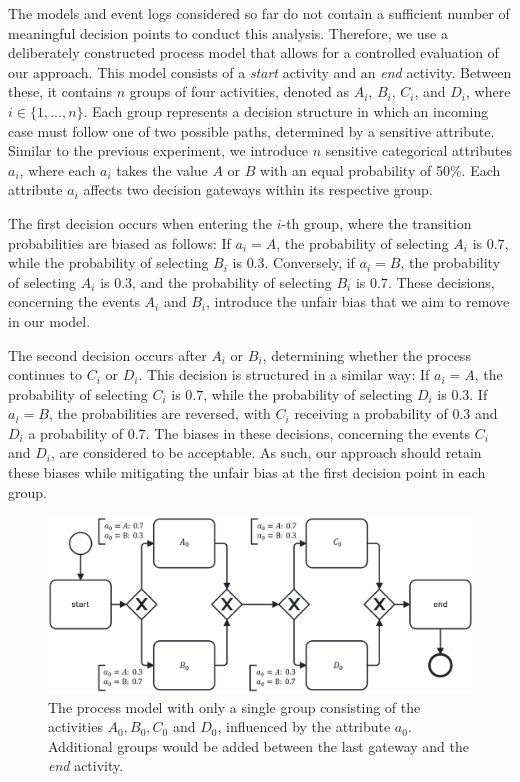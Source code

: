 The models and event logs considered so far do not contain a sufficient number of meaningful decision points to conduct this analysis.
Therefore, we use a deliberately constructed process model that allows for a controlled evaluation of our approach.
This model consists of a \textit{start} activity and an \textit{end} activity.
Between these, it contains $n$ groups of four activities, denoted as $A_i$, $B_i$, $C_i$, and $D_i$, where $i \in \{1, ..., n\}$.
Each group represents a decision structure in which an incoming case must follow one of two possible paths, determined by a sensitive attribute. 
Similar to the previous experiment, we introduce $n$ sensitive categorical attributes $a_i$, where each $a_i$ takes the value $A$ or $B$ with an equal probability of 50\%.
Each attribute $a_i$ affects two decision gateways within its respective group.

The first decision occurs when entering the $i$-th group, where the transition probabilities are biased as follows:
If $a_i = A$, the probability of selecting $A_i$ is $0.7$, while the probability of selecting $B_i$ is $0.3$.
Conversely, if $a_i = B$, the probability of selecting $A_i$ is $0.3$, and the probability of selecting $B_i$ is $0.7$.
These decisions, concerning the events $A_i$ and $B_i$, introduce the unfair bias that we aim to remove in our model. 

The second decision occurs after $A_i$ or $B_i$, determining whether the process continues to $C_i$ or $D_i$.
This decision is structured in a similar way:
If $a_i = A$, the probability of selecting $C_i$ is $0.7$, while the probability of selecting $D_i$ is $0.3$.
If $a_i = B$, the probabilities are reversed, with $C_i$ receiving a probability of $0.3$ and $D_i$ a probability of $0.7$.
The biases in these decisions, concerning the events $C_i$ and $D_i$, are considered to be acceptable.
As such, our approach should retain these biases while mitigating the unfair bias at the first decision point in each group. 

\begin{figure}[h!]
    \centering
    \includegraphics[width=\textwidth]{gfx/ablation_decision.png}
    \caption{The process model with only a single group consisting of the activities $A_0, B_0, C_0$ and $D_0$, influenced by the attribute $a_0$.
    Additional groups would be added between the last gateway and the \textit{end} activity.}
    \label{fig:ablation_decision_model}
\end{figure}

